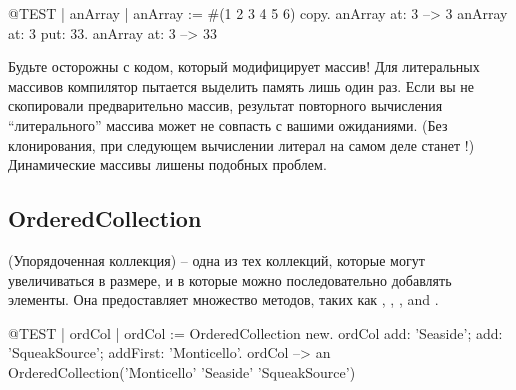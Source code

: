 \documentclass[a4paper,10pt,twoside]{book}
\begin{document}
\begin{code}{@TEST | anArray |}
anArray := #(1 2 3 4 5 6) copy.
anArray at: 3 --> 3
anArray at: 3 put: 33.
anArray at: 3 --> 33
\end{code}

\noindent
Будьте осторожны с кодом, который модифицирует массив!
Для литеральных массивов компилятор пытается выделить память лишь один раз.
Если вы не скопировали предварительно массив, результат повторного вычисления ``литерального'' массива может не совпасть с вашими ожиданиями.
(Без клонирования, при следующем вычислении литерал  на самом деле станет !)
Динамические массивы лишены подобных проблем.

\subsection{OrderedCollection}
 (Упорядоченная коллекция) -- одна из тех коллекций, которые могут увеличиваться в размере, и в которые можно последовательно добавлять элементы. Она предоставляет множество методов, таких как , , , and . 

\begin{code}{@TEST | ordCol |}
ordCol := OrderedCollection new.
ordCol add: 'Seaside'; add: 'SqueakSource'; addFirst: 'Monticello'.
ordCol --> an OrderedCollection('Monticello' 'Seaside' 'SqueakSource')
\end{code}
\end{document}
